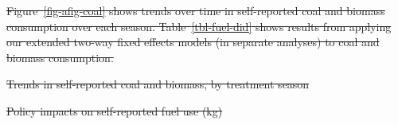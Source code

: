 \documentclass[
  letterpaper,
  DIV=11,
  numbers=noendperiod]{scrartcl}
\makeatletter
\renewenvironment{table}%
   {\renewcommand\familydefault\sfdefault
    \@float{table}}
   {\end@float}
\renewenvironment{figure}%
   {\renewcommand\familydefault\sfdefault
    \@float{figure}}
   {\end@float}
\providecommand{\DIFdeltex}[1]{{\protect\color{red}\sout{#1}}}                      %
\providecommand{\DIFdelFL}[1]{\DIFdel{#1}} %
\providecommand{\DIFdel}[1]{\texorpdfstring{\DIFdeltex{#1}}{}} %
\makeatother
\begin{document}
\DIFdel{Figure~\ref{fig-afig-coal} shows trends over time in self-reported coal
and biomass consumption over each season. Table~\ref{tbl-fuel-did} shows
results from applying our extended two-way fixed effects models (in
separate analyses) to coal and biomass consumption.
}%




{%
\DIFdelFL{Trends in self-reported coal and biomass,
by treatment season}}


{%
\DIFdelFL{Policy impacts on self-reported fuel use (kg) }}%
\end{document}
